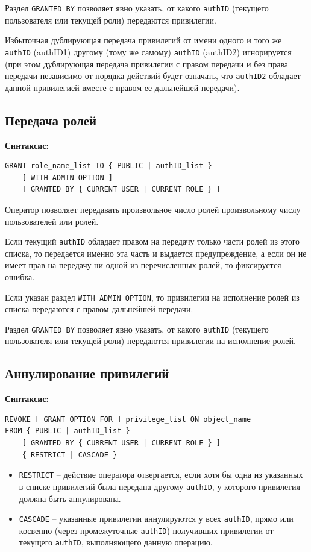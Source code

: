 \documentclass[a4paper,12pt]{article}
\begin{document}
Раздел \texttt{GRANTED BY} позволяет явно указать, от какого \texttt{authID} (текущего пользователя или текущей роли) передаются привилегии.

Избыточная дублирующая передача привилегий от имени одного и того же \texttt{authID} (authID1) другому (тому же самому) \texttt{authID} (authID2) игнорируется (при этом дублирующая передача привилегии с правом передачи и без права передачи независимо от порядка действий будет означать, что \texttt{authID2} обладает данной привилегией вместе с правом ее дальнейшей передачи).

\subsection{Передача ролей}

\textbf{Синтаксис:}
\begin{verbatim}
GRANT role_name_list TO { PUBLIC | authID_list }
    [ WITH ADMIN OPTION ]
    [ GRANTED BY { CURRENT_USER | CURRENT_ROLE } ]
\end{verbatim}

Оператор позволяет передавать произвольное число ролей произвольному числу пользователей или ролей.

Если текущий \texttt{authID} обладает правом на передачу только части ролей из этого списка, то передается именно эта часть и выдается предупреждение, а если он не имеет прав на передачу ни одной из перечисленных ролей, то фиксируется ошибка.

Если указан раздел \texttt{WITH ADMIN OPTION}, то привилегии на исполнение ролей из списка передаются с правом дальнейшей передачи.

Раздел \texttt{GRANTED BY} позволяет явно указать, от какого \texttt{authID} (текущего пользователя или текущей роли) передаются привилегии на исполнение ролей.

\subsection{Аннулирование привилегий}

\textbf{Синтаксис:}
\begin{verbatim}
REVOKE [ GRANT OPTION FOR ] privilege_list ON object_name 
FROM { PUBLIC | authID_list }
    [ GRANTED BY { CURRENT_USER | CURRENT_ROLE } ]
    { RESTRICT | CASCADE }
\end{verbatim}

\begin{itemize}
    \item \texttt{RESTRICT} – действие оператора отвергается, если хотя бы одна из указанных в списке привилегий была передана другому \texttt{authID}, у которого привилегия должна быть аннулирована.
    \item \texttt{CASCADE} – указанные привилегии аннулируются у всех \texttt{authID}, прямо или косвенно (через промежуточные \texttt{authID}) получивших привилегии от текущего \texttt{authID}, выполняющего данную операцию.
\end{itemize}
\end{document}
